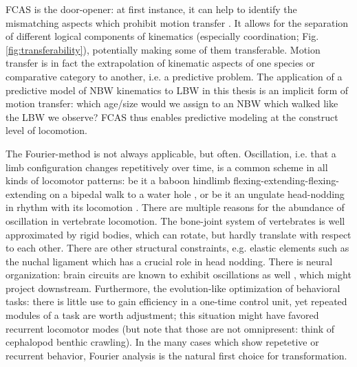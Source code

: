 FCAS is the door-opener: at first instance, it can help to identify the mismatching aspects which prohibit motion transfer \citep{Gatesy2011}.
It allows for the separation of different logical components of kinematics (especially coordination; Fig. \ref{fig:transferability}), potentially making some of them transferable.
Motion transfer is in fact the extrapolation of kinematic aspects of one species or comparative category to another, i.e. a predictive problem.
The application of a predictive model of NBW kinematics to LBW in this thesis is an implicit form of motion transfer: which age/size would we assign to an NBW which walked like the LBW we observe?
FCAS thus enables predictive modeling at the construct level of locomotion.

\bigskip
The Fourier-method is not always applicable, but often.
Oscillation, i.e. that a limb configuration changes repetitively over time, is a common scheme in all kinds of locomotor patterns: be it a baboon hindlimb flexing-extending-flexing-extending on a bipedal walk to a water hole \citep{Druelle2021}, or be it an ungulate head-nodding in rhythm with its locomotion \citep{Loscher2016}.
There are multiple reasons for the abundance of oscillation in vertebrate locomotion.
The bone-joint system of vertebrates is well approximated by rigid bodies, which can rotate, but hardly translate with respect to each other.
There are other structural constraints, e.g. elastic elements such as the nuchal ligament which has a crucial role in head nodding.
There is neural organization: brain circuits are known to exhibit oscillations as well \citep{Gupta2016}, which might project downstream.
Furthermore, the evolution-like optimization of behavioral tasks: there is little use to gain efficiency in a one-time control unit, yet repeated modules of a task are worth adjustment; this situation might have favored recurrent locomotor modes (but note that those are not omnipresent: think of cephalopod benthic crawling).
In the many cases which show repetetive or recurrent behavior, Fourier analysis is the natural first choice for transformation.

